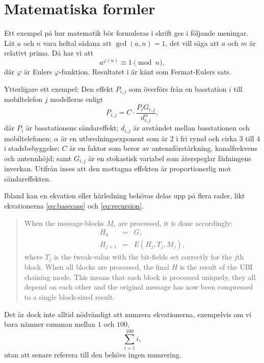 \section{Matematiska formler}
\label{sec:maths}
\noindent
Ett exempel på hur matematik bör formuleras i skrift ges i följande meningar.
Låt \(a\) och \(n\) vara heltal sådana att \(\gcd(a,n) = 1\), det vill säga att 
\(a\) och \(m\) är relativt prima.
Då har vi att
\begin{equation}
	\label{eq:fermat-euler}
	a^{\varphi(n)} \equiv 1 \pmod n,
\end{equation}
där \(\varphi\) är Eulers \(\varphi\)-funktion.
Resultatet i  är känt som Fermat-Eulers sats.

Ytterligare ett exempel:
Den effekt \(P_{i,j}\) som överförs från en basstation \(i\) till mobiltelefon 
\(j\) modelleras enligt
\begin{equation}
	\label{eq:power}
	P_{i,j} = C\cdot \frac{P_i G_{i,j}}{d^\alpha_{i,j}},
\end{equation}
där \(P_i\) är basstationens sändareffekt; \(d_{i,j}\) är avståndet mellan 
basstationen och mobiltelefonen; \(\alpha\) är en utbredningsexponent som är 
\(2\) i fri rymd och cirka \(3\) till \(4\) i stadsbebyggelse; \(C\) är en 
faktor som beror av antennförstärkning, kanalfrekvens och antennhöjd; samt 
\(G_{i,j}\) är en stokastisk variabel som återspeglar fädningens inverkan.
Utifrån  inses att den mottagna effekten är proportionerlig 
mot sändareffekten.

Ibland kan en ekvation eller härledning behövas delas upp på flera rader, likt 
ekvationerna \eqref{eq:basecase} och \eqref{eq:recursion}.
\begin{quotation}
	When the message-blocks \(M_i\) are processed, it is done accordingly:
	\begin{eqnarray}
		\label{eq:basecase}
		H_0 &=& G, \\
		\label{eq:recursion}
		H_{j+1} &=& E(H_j, T_j, M_j),
	\end{eqnarray}
	where \(T_j\) is the tweak-value with the bit-fields set correctly for the
	\(j\)th block. When all blocks are processed, the final \(H\) is the result 
	of the UBI chaining mode.
	This means that each block is processed uniquely, they all depend on each 
	other and the original message has now been compressed to a single 
	block-sized result.
\end{quotation}

Det är dock inte alltid nödvändigt att numrera ekvationerna, exempelvis om vi 
bara nämner summan mellan \(1\) och \(100\),
\begin{equation}
	\nonumber
	\sum^{100}_{i=1} i,
\end{equation}
utan att senare referera till den behövs ingen numrering.
